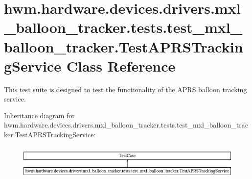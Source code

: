 \hypertarget{classhwm_1_1hardware_1_1devices_1_1drivers_1_1mxl__balloon__tracker_1_1tests_1_1test__mxl__ballo85cb9f09344d47402c35803686488a42}{\section{hwm.\-hardware.\-devices.\-drivers.\-mxl\-\_\-balloon\-\_\-tracker.\-tests.\-test\-\_\-mxl\-\_\-balloon\-\_\-tracker.\-Test\-A\-P\-R\-S\-Tracking\-Service Class Reference}
\label{classhwm_1_1hardware_1_1devices_1_1drivers_1_1mxl__balloon__tracker_1_1tests_1_1test__mxl__ballo85cb9f09344d47402c35803686488a42}
}


This test suite is designed to test the functionality of the A\-P\-R\-S balloon tracking service.  


Inheritance diagram for hwm.\-hardware.\-devices.\-drivers.\-mxl\-\_\-balloon\-\_\-tracker.\-tests.\-test\-\_\-mxl\-\_\-balloon\-\_\-tracker.\-Test\-A\-P\-R\-S\-Tracking\-Service\-:\begin{figure}[H]
\begin{center}
\leavevmode
\includegraphics[height=1.758242cm]{classhwm_1_1hardware_1_1devices_1_1drivers_1_1mxl__balloon__tracker_1_1tests_1_1test__mxl__ballo85cb9f09344d47402c35803686488a42}
\end{center}
\end{figure}
